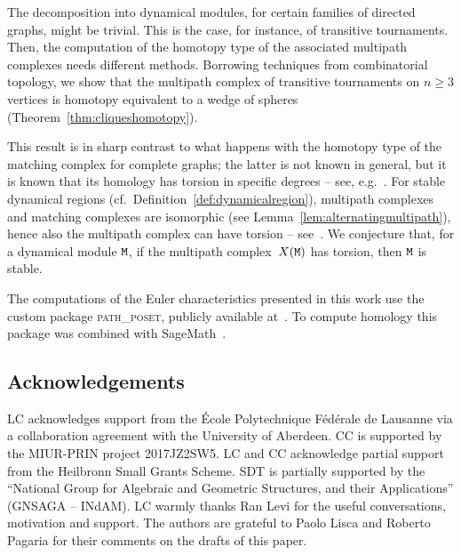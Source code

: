 \documentclass{amsart}
\begin{document}
 
 
The decomposition into dynamical modules, for certain families of directed graphs, might be trivial. This is the case, for instance, of transitive tournaments. Then, the computation of the homotopy type of the associated multipath complexes needs different methods. Borrowing techniques from combinatorial topology, we show that the multipath complex of transitive tournaments on $n\geq 3$ vertices is  homotopy equivalent to a wedge of spheres (Theorem~\ref{thm:cliqueshomotopy}). 

This result is in sharp contrast to what happens with the homotopy type of the matching complex for complete graphs; the latter is not known in general, but it is known that its homology has torsion in specific degrees -- see, e.g.~\cite{torsion, MR2470116, MR2731551}. For stable 
 dynamical regions (cf.~Definition~\ref{def:dynamicalregion}), multipath complexes and matching complexes are isomorphic (see Lemma~\ref{lem:alternatingmultipath}), hence also the multipath complex can have torsion -- see~\cite[Proposition~4.5]{SpriSecondo}. We conjecture that, for a dynamical module ${\tt M}$, if  the multipath complex~$X({\tt M})$ has torsion, then ${\tt M}$ is stable.



The computations of the Euler characteristics presented in this work use the custom package \textsc{path\_poset}, publicly available at~\cite{pathposet}. To compute homology this package was combined with SageMath~\cite{sagemath}.  


\subsection*{Acknowledgements}

LC acknowledges support from the \'{E}cole Polytechnique F\'{e}d\'{e}rale de Lausanne via a collaboration agreement with the University of Aberdeen. CC is supported by the MIUR-PRIN project 2017JZ2SW5.
LC and CC acknowledge partial support from the Heilbronn Small Grants Scheme. SDT is partially supported by the “National Group for Algebraic and Geometric Structures, and their Applications” (GNSAGA – INdAM). 
LC warmly thanks Ran Levi for the useful conversations, motivation and support.
The authors are grateful to Paolo Lisca and Roberto Pagaria for their comments on the drafts of this paper.
\end{document}
